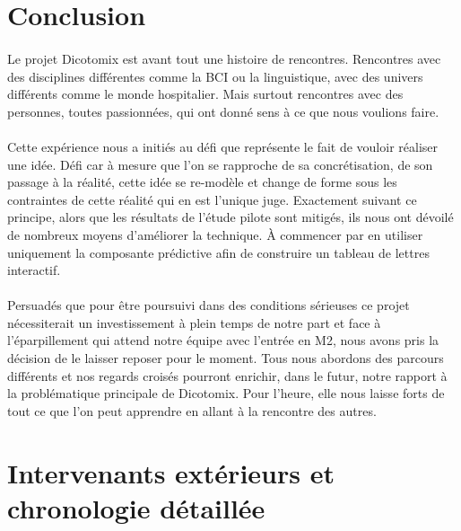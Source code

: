 \documentclass[11pt,a4paper]{article}
\theoremstyle{plain}
\theoremstyle{definition}
\begin{document}
\section{Conclusion}

\paragraph{} Le projet Dicotomix est avant tout une histoire de rencontres. Rencontres avec des disciplines différentes comme la BCI ou la linguistique, avec des univers différents comme le monde hospitalier. 
Mais surtout rencontres avec des personnes, toutes passionnées, qui ont donné sens à ce que nous voulions faire.
 
\paragraph{}Cette expérience nous a initiés au défi que représente le fait de vouloir réaliser une idée. Défi car à mesure que l'on se rapproche de sa concrétisation, de son passage à la réalité, cette idée se re-modèle et change de forme sous les contraintes de cette réalité qui en est l'unique juge. Exactement suivant ce principe, alors que les résultats de l'étude pilote sont mitigés, ils nous ont dévoilé de nombreux moyens d'améliorer la technique. À commencer par en utiliser uniquement la composante prédictive afin de construire un tableau de lettres interactif.

\paragraph{} Persuadés que pour être poursuivi dans des conditions sérieuses ce projet nécessiterait un investissement à plein temps de notre part et face à l'éparpillement qui attend notre équipe avec l'entrée 
en M2, nous avons pris la décision de le laisser reposer pour le moment. Tous nous abordons des parcours différents et nos regards croisés pourront enrichir, dans le futur, notre rapport 
à la problématique principale de Dicotomix. Pour l'heure, elle nous laisse forts de tout ce que l'on peut apprendre en allant à la rencontre des autres.

\newpage
\appendix
\section{Intervenants extérieurs et chronologie détaillée}
\end{document}

